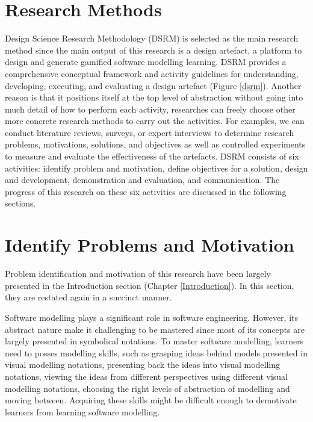 \documentclass[12pt, a4paper]{report} \usepackage[titletoc]{appendix}
\begin{document}
\section{Research Methods}
\label{Research Methods}
Design Science Research Methodology (DSRM) is selected as the main research method since the main output of this research is a design artefact, a platform to design and generate gamified software modelling learning. DSRM provides a comprehensive conceptual framework and activity guidelines for understanding, developing, executing, and evaluating a design artefact (Figure \ref{dsrm}). Another reason is that it positions itself at the top level of abstraction without going into much detail of how to perform each activity, researches can freely choose other more concrete research methods to carry out the activities. For examples, we can conduct literature reviews, surveys, or expert interviews to determine research problems, motivations, solutions, and objectives as well as controlled experiments to measure and evaluate the effectiveness of the artefacts. DSRM consists of six activities: identify problem and motivation, define objectives for a solution, design and development, demonstration and evaluation, and communication. The progress of this research on these six activities are discussed in the following sections.

\section{Identify Problems and Motivation}
Problem identification and motivation of this research have been largely presented in the Introduction section (Chapter \ref{Introduction}). In this section, they are restated again in a succinct manner. 

Software modelling plays a significant role in software engineering. However, its abstract nature make it challenging to be mastered since most of its concepts are largely presented in symbolical notations. To master software modelling, learners need to posses modelling skills, such as grasping ideas behind models presented in visual modelling notations, presenting back the ideas into visual modelling notations, viewing the ideas from different perspectives using different visual modelling notations, choosing the right levels of abstraction of modelling and moving between. Acquiring these skills might be difficult enough to demotivate learners from learning software modelling.
\end{document}
